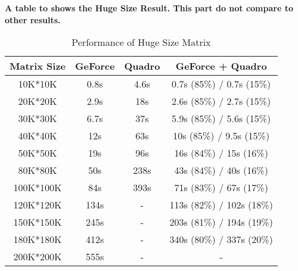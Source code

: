 \textbf{A table to shows the Huge Size Result. This part do not compare to other results.} 

\begin{table}[h]
\caption{Performance of Huge Size Matrix}
\centering
\begin{tabular}{|c|c|c|c|}
\hline
Matrix Size & GeForce & Quadro & GeForce + Quadro \\ \hline
 10K*10K    &   0.8s  &  4.6s  &   0.7s (85\%) / 0.7s (15\%) \\ \hline
 20K*20K    &   2.9s  &   18s  &   2.6s (85\%) / 2.7s (15\%) \\ \hline
 30K*30K    &   6.7s  &   37s  &   5.9s (85\%) / 5.6s (15\%) \\ \hline
 40K*40K    &    12s  &   63s  &    10s (85\%) / 9.5s (15\%) \\ \hline
 50K*50K    &    19s  &   96s  &    16s (84\%) /  15s (16\%) \\ \hline
 80K*80K    &    50s  &  238s  &    43s (84\%) /  40s (16\%) \\ \hline
 100K*100K  &    84s  &  393s  &    71s (83\%) /  67s (17\%) \\ \hline
 120K*120K  &   134s  &     -  &   113s (82\%) / 102s (18\%) \\ \hline
 150K*150K  &   245s  &     -  &   203s (81\%) / 194s (19\%) \\ \hline
 180K*180K  &   412s  &     -  &   340s (80\%) / 337s (20\%) \\ \hline
 200K*200K  &   555s  &     -  &   -  \\ \hline
\end{tabular}
\label{tab:hresult}
\end{table}

